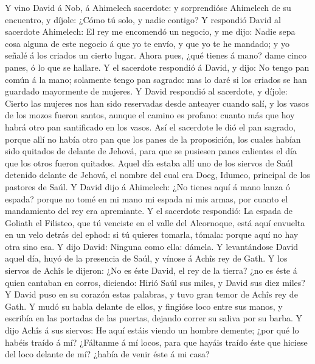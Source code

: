  Y vino David á Nob, á Ahimelech sacerdote: y sorprendióse
Ahimelech de su encuentro, y díjole: ¿Cómo tú solo, y nadie contigo?
 Y respondió David al sacerdote Ahimelech: El rey me
encomendó un negocio, y me dijo: Nadie sepa cosa alguna de este negocio
á que yo te envío, y que yo te he mandado; y yo señalé á los criados un
cierto lugar.  Ahora pues, ¿qué tienes á mano? dame cinco
panes, ó lo que se hallare.  Y el sacerdote respondió á
David, y dijo: No tengo pan común á la mano; solamente tengo pan
sagrado: mas lo daré si los criados se han guardado mayormente de
mujeres.  Y David respondió al sacerdote, y díjole: Cierto
las mujeres nos han sido reservadas desde anteayer cuando salí, y los
vasos de los mozos fueron santos, aunque el camino es profano: cuanto
más que hoy habrá otro pan santificado en los vasos.  Así
el sacerdote le dió el pan sagrado, porque allí no había otro pan que
los panes de la proposición, los cuales habían sido quitados de delante
de Jehová, para que se pusiesen panes calientes el día que los otros
fueron quitados.  Aquel día estaba allí uno de los siervos
de Saúl detenido delante de Jehová, el nombre del cual era Doeg, Idumeo,
principal de los pastores de Saúl.  Y David dijo á
Ahimelech: ¿No tienes aquí á mano lanza ó espada? porque no tomé en mi
mano mi espada ni mis armas, por cuanto el mandamiento del rey era
apremiante.  Y el sacerdote respondió: La espada de
Goliath el Filisteo, que tú venciste en el valle del Alcornoque, está
aquí envuelta en un velo detrás del ephod: si tú quieres tomarla,
tómala: porque aquí no hay otra sino esa. Y dijo David: Ninguna como
ella: dámela.  Y levantándose David aquel día, huyó de la
presencia de Saúl, y vínose á Achîs rey de Gath.  Y los
siervos de Achîs le dijeron: ¿No es éste David, el rey de la tierra? ¿no
es éste á quien cantaban en corros, diciendo: Hirió Saúl sus miles, y
David sus diez miles?  Y David puso en su corazón estas
palabras, y tuvo gran temor de Achîs rey de Gath.  Y mudó
su habla delante de ellos, y fingióse loco entre sus manos, y escribía
en las portadas de las puertas, dejando correr su saliva por su barba.
 Y dijo Achîs á sus siervos: He aquí estáis viendo un
hombre demente; ¿por qué lo habéis traído á mí? 
¿Fáltanme á mí locos, para que hayáis traído éste que hiciese del loco
delante de mí? ¿había de venir éste á mi casa?

